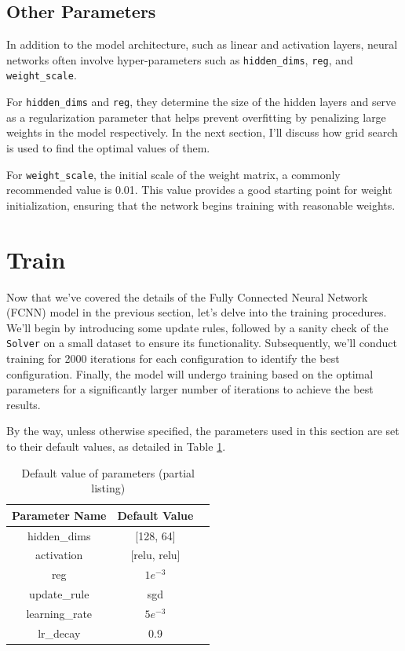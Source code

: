 \documentclass[10pt,a4paper,twoside]{tau}
\begin{document}
\subsection{Other Parameters}

In addition to the model architecture, such as linear and activation layers, neural networks often involve hyper-parameters such as \texttt{hidden\_dims}, \texttt{reg}, and \texttt{weight\_scale}. 

For \texttt{hidden\_dims} and \texttt{reg}, they determine the size of the hidden layers and serve as a regularization parameter that helps prevent overfitting by penalizing large weights in the model respectively. In the next section, I'll discuss how grid search is used to find the optimal values of them.

For \texttt{weight\_scale}, the initial scale of the weight matrix, a commonly recommended value is 0.01. This value provides a good starting point for weight initialization, ensuring that the network begins training with reasonable weights.



\section{Train}

Now that we've covered the details of the Fully Connected Neural Network (FCNN) model in the previous section, let's delve into the training procedures. We'll begin by introducing some update rules, followed by a sanity check of the \texttt{Solver} on a small dataset to ensure its functionality. Subsequently, we'll conduct training for 2000 iterations for each configuration to identify the best configuration. Finally, the model will undergo training based on the optimal parameters for a significantly larger number of iterations to achieve the best results.

By the way, unless otherwise specified, the parameters used in this section are set to their default values, as detailed in Table \ref{tab:parameters}.


\begin{table}[h]
    \centering
    \begin{tabular}{|c|c|c|}
        \hline
        \textbf{Parameter Name} & \textbf{Default Value} \\
        \hline
        hidden\_dims & [128, 64]  \\
        \hline
        activation & [relu, relu] \\
        \hline
        reg & $1e^{-3}$ \\
        \hline
        update\_rule & sgd \\
        \hline
        learning\_rate & $5e^{-3}$ \\
        \hline
        lr\_decay & 0.9 \\
        \hline
    \end{tabular}
    \caption{Default value of parameters (partial listing)}
    \label{tab:parameters}
\end{table}
\end{document}
